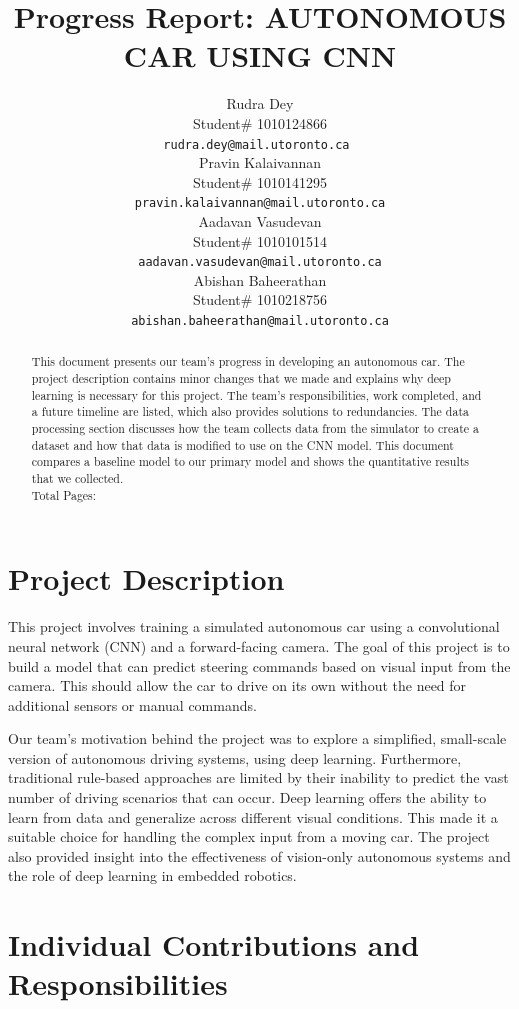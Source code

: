 \documentclass{article} %
\title{Progress Report: AUTONOMOUS CAR USING CNN\\}
\author{Rudra Dey  \\
Student\# 1010124866\\
\texttt{rudra.dey@mail.utoronto.ca } \\
\And
Pravin Kalaivannan  \\
Student\# 1010141295 \\ 
\texttt{pravin.kalaivannan@mail.utoronto.ca} \\
\AND
Aadavan Vasudevan  \\
Student\# 1010101514 \\
\texttt{aadavan.vasudevan@mail.utoronto.ca} \\
\And
Abishan Baheerathan \\
Student\# 1010218756 \\
\texttt{abishan.baheerathan@mail.utoronto.ca} \\
\AND
}
\begin{document}
\maketitle

\begin{abstract}
This document presents our team’s progress in developing an autonomous car. The project description contains minor changes that we made and explains why deep learning is necessary for this project. The team’s responsibilities, work completed, and a future timeline are listed, which also provides solutions to redundancies. The data processing section discusses how the team collects data from the simulator to create a dataset and how that data is modified to use on the CNN model. This document compares a baseline model to our primary model and shows the quantitative results that we collected. 
\\
Total Pages: \pageref{last_page}
\end{abstract}

\section{Project Description}

This project involves training a simulated autonomous car using a convolutional neural network (CNN) and a forward-facing camera. The goal of this project is to build a model that can predict steering commands based on visual input from the camera. This should allow the car to drive on its own without the need for additional sensors or manual commands.  

Our team’s motivation behind the project was to explore a simplified, small-scale version of autonomous driving systems, using deep learning. Furthermore, traditional rule-based approaches are limited by their inability to predict the vast number of driving scenarios that can occur. Deep learning offers the ability to learn from data and generalize across different visual conditions. This made it a suitable choice for handling the complex input from a moving car. The project also provided insight into the effectiveness of vision-only autonomous systems and the role of deep learning in embedded robotics.


\section{Individual Contributions and Responsibilities}
\end{document}

